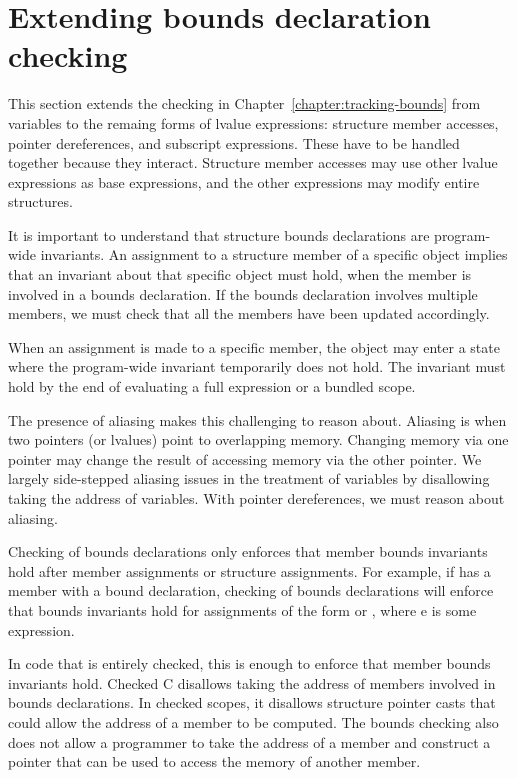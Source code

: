\section{Extending bounds declaration checking}
\label{section:checking-bounds-with-structures}

This section extends the checking in Chapter~\ref{chapter:tracking-bounds} from
variables to the remaing forms of lvalue expressions: structure member accesses, pointer
dereferences, and subscript expressions.  These have to be handled together because
they interact.  Structure member accesses may use other lvalue expressions as 
base expressions, and the other expressions may modify entire structures.

It is important to understand that structure bounds declarations are program-wide invariants.
An assignment to a structure member of a specific object implies that an invariant about
that specific object must hold, when the member is involved in a bounds declaration.
If the bounds declaration involves multiple members, we must check that all the members have
been updated accordingly.  

When an assignment is made to a specific member, the object may enter a state where the
program-wide invariant temporarily does not hold.  The invariant must hold by the end of evaluating 
a full expression or a bundled scope.

The presence of aliasing makes this challenging to reason about.  Aliasing is when two pointers
(or lvalues) point to overlapping memory.   Changing memory via one pointer may change the
result of accessing memory via the other pointer.  We largely side-stepped aliasing issues in the
treatment of variables by disallowing taking the address of variables.  With pointer dereferences,
we must reason about aliasing.

Checking of bounds declarations only enforces that member bounds invariants hold after member
assignments or structure assignments.  For example, if  has a member 
with a bound declaration, checking of bounds declarations will enforce that bounds invariants hold 
for assignments  of the form  or , where e is some expression.

In code that is entirely checked, this is enough to enforce that member bounds invariants hold.  
Checked C disallows taking the address of members involved in bounds declarations.
In checked scopes, it disallows structure pointer casts that could allow the address of
a member to be computed.   The bounds checking also does not allow a programmer
to take the address of a member and construct a pointer that can be used to
access the memory of another member.

